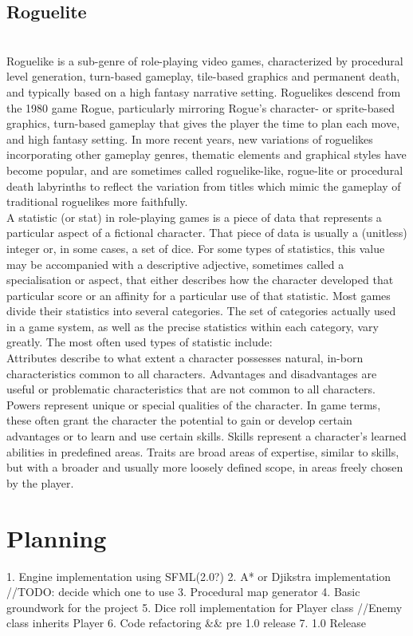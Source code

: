 \documentclass{article}
\begin{document}
	\subsection{Roguelite}
\\
Roguelike is a sub-genre of role-playing video games, characterized by procedural
level generation, turn-based gameplay, tile-based graphics and permanent death,
and typically based on a high fantasy narrative setting. Roguelikes descend from
the 1980 game Rogue, particularly mirroring Rogue's character- or sprite-based
graphics, turn-based gameplay that gives the player the time to plan each move,
and high fantasy setting. In more recent years, new variations of roguelikes
incorporating other gameplay genres, thematic elements and graphical styles have
become popular, and are sometimes called roguelike-like, rogue-lite or
procedural death labyrinths to reflect the variation from titles which mimic
the gameplay of traditional roguelikes more faithfully.
\\
A statistic (or stat) in role-playing games is a piece of data that represents
a particular aspect of a fictional character. That piece of data is usually
a (unitless) integer or, in some cases, a set of dice. For some types of statistics,
this value may be accompanied with a descriptive adjective, sometimes called a
specialisation or aspect, that either describes how the character developed that
particular score or an affinity for a particular use of that statistic.
Most games divide their statistics into several categories. The set of categories
actually used in a game system, as well as the precise statistics within each
category, vary greatly.
The most often used types of statistic include:
\\
Attributes describe to what extent a character possesses natural, in-born
characteristics common to all characters.
Advantages and disadvantages are useful or problematic characteristics that are
not common to all characters.
Powers represent unique or special qualities of the character. In game terms,
these often grant the character the potential to gain or develop certain advantages
or to learn and use certain skills.
Skills represent a character's learned abilities in predefined areas.
Traits are broad areas of expertise, similar to skills, but with a broader and
usually more loosely defined scope, in areas freely chosen by the player.
\\
\section{Planning}
	1. Engine implementation using SFML(2.{0?})
	2. A* or Djikstra implementation		//TODO: decide which one to use
	3. Procedural map generator
	4. Basic groundwork for the project
	5. Dice roll implementation for Player class	//Enemy class inherits Player
	6. Code refactoring && pre 1.0 release
	7. 1.0 Release
\\
\end{document}
